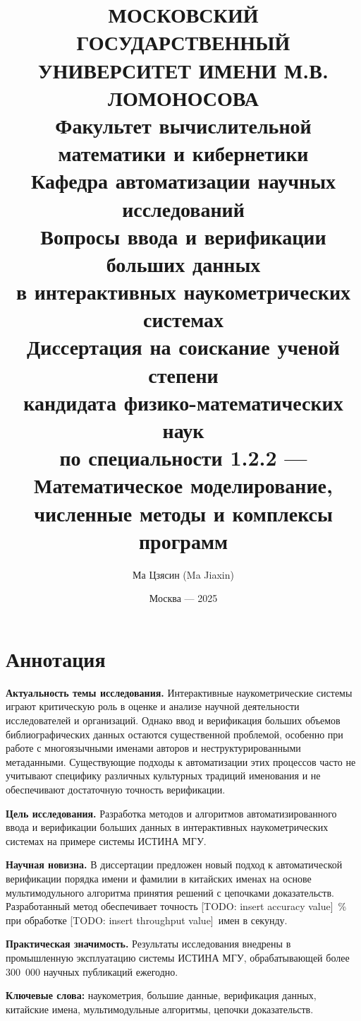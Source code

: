 \documentclass[12pt,a4paper]{report}
\title{
    {\Large МОСКОВСКИЙ ГОСУДАРСТВЕННЫЙ УНИВЕРСИТЕТ ИМЕНИ М.В. ЛОМОНОСОВА}\\[1cm]
    {\Large Факультет вычислительной математики и кибернетики}\\[1cm]
    {\Large Кафедра автоматизации научных исследований}\\[2cm]
    {\LARGE\textbf{Вопросы ввода и верификации больших данных\\
    в интерактивных наукометрических системах}}\\[1cm]
    {\large Диссертация на соискание ученой степени\\
    кандидата физико-математических наук}\\[0.5cm]
    {\large по специальности 1.2.2 — Математическое моделирование,\\
    численные методы и комплексы программ}
}
\author{Ма Цзясин (Ma Jiaxin)}
\date{Москва — 2025}
\theoremstyle{definition}
\theoremstyle{remark}
\begin{document}


\maketitle

\thispagestyle{empty}
\clearpage


\chapter*{Аннотация}

\textbf{Актуальность темы исследования.}
Интерактивные наукометрические системы играют критическую роль в оценке и анализе научной деятельности исследователей и организаций. Однако ввод и верификация больших объемов библиографических данных остаются существенной проблемой, особенно при работе с многоязычными именами авторов и неструктурированными метаданными. Существующие подходы к автоматизации этих процессов часто не учитывают специфику различных культурных традиций именования и не обеспечивают достаточную точность верификации.

\textbf{Цель исследования.}
Разработка методов и алгоритмов автоматизированного ввода и верификации больших данных в интерактивных наукометрических системах на примере системы ИСТИНА МГУ.

\textbf{Научная новизна.}
В диссертации предложен новый подход к автоматической верификации порядка имени и фамилии в китайских именах на основе мультимодульного алгоритма принятия решений с цепочками доказательств. Разработанный метод обеспечивает точность [TODO: insert accuracy value]~\% при обработке [TODO: insert throughput value]~имен в секунду.

\textbf{Практическая значимость.}
Результаты исследования внедрены в промышленную эксплуатацию системы ИСТИНА МГУ, обрабатывающей более 300~000 научных публикаций ежегодно.

\textbf{Ключевые слова:}
наукометрия, большие данные, верификация данных, китайские имена, мультимодульные алгоритмы, цепочки доказательств.

\clearpage

\end{document}
